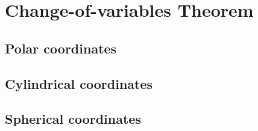 \section{Change-of-variables Theorem}

\subsection{Polar coordinates}

\subsection{Cylindrical coordinates}

\subsection{Spherical coordinates}
